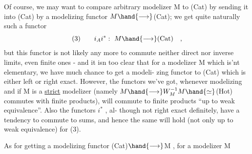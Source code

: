 Of course,  we may want to compare   arbitrary modelizer M to (Cat)
by sending it into (Cat) by a modelizing functor  $M\hand{\longrightarrow}$(Cat);  we get quite
naturally such a functor 
\[ \text{(3)}\qquad i_Ai^{*} :\ M\hand{\longrightarrow}\text{(Cat)}\quad , \]
but this functor is not likely any more to commute  neither  direct nor
inverse limits, even finite ones  -  and it isn too clear that for a
modelizer M which is'nt elementary,  we have much chance to get a modeli-%
zing functor to (Cat) which is either left or right exact.  However,  the
functors  we've got,  whenever modelizing and if M is a \uline{strict} modelizer
(namely $M\hand{\longrightarrow} W_M^{-1}M\hand{\simeq}$(Hot)  commutes with finite products),  will commute
to finite products ``up to weak equivalence''.  Also the functors $i^{*}$ ,  al-%
though not right exact definitely,  have a tendency to commute to sums,
and hence the same will hold (not only up to weak equivalence) for (3).

As for getting a modelizing functor  (Cat)$\hand{\longrightarrow}$M ,  for a modelizer M

